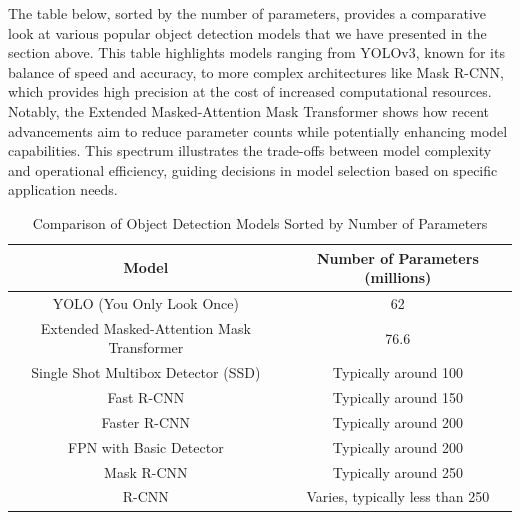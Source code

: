 \vspace{1.5cm}

The table below, sorted by the number of parameters, provides a comparative look at various popular object detection models that we have presented in the 
section above. This table highlights models ranging from YOLOv3, known for its balance of speed and accuracy, to more complex architectures like Mask R-CNN, 
which provides high precision at the cost of increased computational resources. Notably, the Extended Masked-Attention Mask Transformer shows how recent 
advancements aim to reduce parameter counts while potentially enhancing model capabilities. This spectrum illustrates the trade-offs between model complexity 
and operational efficiency, guiding decisions in model selection based on specific application needs.

\begin{table}[h]
    \centering
    \begin{tabular}{|c|c|}
    \hline
    \textbf{Model}                                 & \textbf{Number of Parameters (millions)} \\ \hline
    YOLO (You Only Look Once)                      & 62                                      \\ \hline
    Extended Masked-Attention Mask Transformer     & 76.6                                    \\ \hline
    Single Shot    Multibox Detector (SSD)         & Typically around 100                    \\ \hline
    Fast R-CNN                                     & Typically around 150                    \\ \hline
    Faster R-CNN                                   & Typically around 200                    \\ \hline
    FPN with Basic Detector                        & Typically around 200                    \\ \hline
    Mask R-CNN                                     & Typically around 250                    \\ \hline
    R-CNN                                          & Varies, typically less than 250         \\ \hline
    \end{tabular}
    \caption{Comparison of Object Detection Models Sorted by Number of Parameters}
    \label{tab:model_parameters}
\end{table}
    
